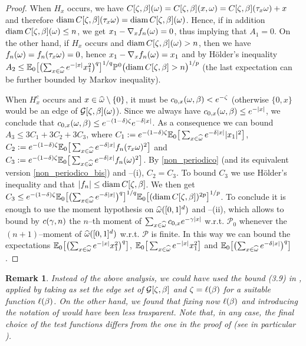 \documentclass[12pt,a4paper,reqno]{amsart}
\newtheorem{Remark}[Theorem]{Remark}
\newcommand{\cG}{\ensuremath{\mathcal G}}
\newcommand{\cP}{\ensuremath{\mathcal P}}
\newcommand{\bbE}{{\ensuremath{\mathbb E}} }
\newcommand{\bbP}{{\ensuremath{\mathbb P}} }
\newcommand{\vvv}{\textcolor{black}} %
\newcommand{\vpz}{\vvv{\bbP^{\hspace{0.013cm}0} }}
\begin{document}
\begin{proof}
 When   $H_x $ occurs, we have    
$
C[\zeta,\beta](\omega)=C[\zeta,\beta](x,\omega)= C[\zeta, \beta](\tau_x \omega) +x$
and therefore $
{\rm diam}\, C[\zeta,\beta](\tau_x\omega) =  {\rm diam}\, C[\zeta,\beta](\omega) $. Hence, if in addition   ${\rm diam}\, C[\zeta,\beta](\omega) \leq n$, we get $x_1-\nabla_x f_{n}(\omega) =0$, thus implying that $A_1=0$. On the other hand, if $H_x$ occurs and ${\rm diam}\, C[\zeta,\beta](\omega) > n$,  then we  have $f_n(\omega)=f_n(\tau_x\omega)=0$, hence  $x_1-\nabla_x f_{n}(\omega) =x_1$
and by H\"older's inequality 
 $A_2 \leq  \bbE_0 \big[ \bigl( \sum_{x\in \widehat \o}  e^{-|x|} x_1^2 \bigr)^q \big]^{1/q} 
 \vpz\bigl( {\rm diam}\, C[\z,\b] > n  \bigr)^{1/p}$ (the last expectation can be further bounded by Markov inequality).

 When $H_x^c$ occurs and $x\in \widehat{\omega}\setminus\{0\}$, it must be   $c_{0,x}(\omega,\beta) < e^{-\zeta}$ (otherwise $\{0,x\}$ would be an edge of $\cG[\z,\b](\o)$). Since we always have $c_{0,x}(\omega,\beta) \leq e^{-|x|}$, we conclude that $c_{0,x}(\omega,\beta) \leq e^{-(1-\delta)\zeta}e^{-\delta|x|}$.
 As a consequence   we can bound
$
A_3 \leq  3 C_1+3C_2+3C_3$, where 
$C_1:=e^{-(1-\d)\z}\bbE_0 \big[ \sum_{x\in \widehat \o} e^{-\d|x|}  |x_1|^2\big]$, $C_2:=e^{-(1-\d)\z} \bbE_0 \big[ \sum_{x\in \widehat \o}  e^{-\d|x|} f_n(\t_x\o) ^2  \big]$ and 
$ C_3:=e^{-(1-\d)\z} \bbE_0 \big[ \sum_{x\in \widehat \o}  e^{-\d|x|} f_n(\o) ^2  \big]$. By \eqref{non_periodico} (and its equivalent version \eqref{non_periodico_bis}) and \cite[Lemma~1]{FM}--(i), $C_2=C_3$. To bound  $C_3$ we use H\"older's inequality and  that $|f_n|\leq  {\rm diam}\, C[\zeta,\beta]$. We then   get
$C_3\leq e^{-(1-\d)\z}
\bbE_0 \big[ \bigl( \sum_{x\in \widehat \o}  e^{-\d|x|}\bigr) ^q  \big]^{1/q}
   \bbE_0 \bigl[ ( {\rm diam}\, C[\z,\b])^{2 p}  \bigr] ^{1/p}
   $. To conclude it is enough to use  the moment hypothesis on $\widehat{\omega}([0,1]^d)$ and  \cite[Lemma~1]{FM}--(ii), which allows to bound by $c(\gamma,n)$ the $n$--th moment of $\sum_{x\in \widehat{\omega}}c_{0,x} e^{-\gamma|x|}$ w.r.t. $\cP_0$ whenever the $(n+1)$--moment of  $\widehat{\omega}([0,1]^d)$ w.r.t. $\cP$ is finite. In this way we can bound the expectations  $\bbE_0 \big[ \bigl( \sum_{x\in \widehat \o}  e^{-|x|} x_1^2 \bigr)^q \big] $,  $\bbE_0 \big[  \sum_{x\in \widehat \o}  e^{-|x|} x_1^2  \big] $ and $\bbE_0 \big[ \bigl( \sum_{x\in \widehat \o}  e^{-\d|x|}\bigr) ^q  \big]$.
\end{proof}

\begin{Remark}\label{bischero} Instead of the above analysis, we could have  used the bound (3.9) in \cite[Prop.~1]{FM}, applied by taking as set   \cite[Eq.~(3.1)]{FM} the edge set  of $\cG [\z,\b]$ and $\zeta=\ell(\beta)$ for a suitable function $\ell(\beta)$. On the other hand, we found that fixing now $\ell(\beta)$ and introducing the notation of \cite{FM} would have been less trasparent. Note that, in any case, the final choice of the test functions differs from the one in the proof of \cite[Theorem~1]{FM} (see in particular \cite[p.~276]{FM}).
  \end{Remark}
\end{document}
